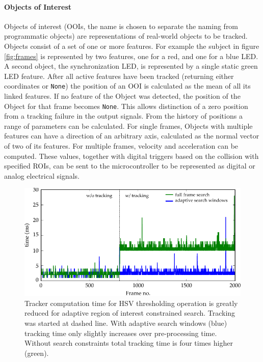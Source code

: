 \paragraph{Objects of Interest}
\label{sec:ObjectsOfInterest}
Objects of interest (OOIs, the name is chosen to separate the naming from programmatic objects) are representations of real-world objects to be tracked. Objects consist of a set of one or more features. For example the subject in figure \ref{fig:frames} is represented by two features, one for a red, and one for a blue LED. A second object, the synchronization LED, is represented by a single static green LED feature. After all active features have been tracked (returning either coordinates or \texttt{None}) the position of an OOI is calculated as the mean of all its linked features. If no feature of the Object was detected, the position of the Object for that frame becomes \texttt{None}. This allows distinction of a zero position from a tracking failure in the output signals. From the history of positions a range of parameters can be calculated. For single frames, Objects with multiple features can have a direction of an arbitrary axis, calculated as the normal vector of two of its features. For multiple frames, velocity and acceleration can be computed. These values, together with digital triggers based on the collision with specified ROIs, can be sent to the microcontroller to be represented as digital or analog electrical signals.


\begin{figure}%
	\centering
		\includegraphics [width=\linewidth]{gfx/tracking.pdf} %
	\caption[Test]{Tracker computation time for HSV thresholding operation is greatly reduced for adaptive region of interest constrained search. Tracking was started at dashed line. With adaptive search windows (blue) tracking time only slightly increases over pre-processing time. Without search constraints total tracking time is four times higher (green).}
	\label{fig:tracking}
\end{figure}

